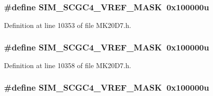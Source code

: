 \subsubsection[{\texorpdfstring{S\+I\+M\+\_\+\+S\+C\+G\+C4\+\_\+\+V\+R\+E\+F\+\_\+\+M\+A\+SK}{SIM_SCGC4_VREF_MASK}}]{\setlength{\rightskip}{0pt plus 5cm}\#define S\+I\+M\+\_\+\+S\+C\+G\+C4\+\_\+\+V\+R\+E\+F\+\_\+\+M\+A\+SK~0x100000u}\hypertarget{group___s_i_m___register___masks_gab32de0f8a4b83a05b226638154da75c0}{}\label{group___s_i_m___register___masks_gab32de0f8a4b83a05b226638154da75c0}


Definition at line 10353 of file M\+K20\+D7.\+h.

\subsubsection[{\texorpdfstring{S\+I\+M\+\_\+\+S\+C\+G\+C4\+\_\+\+V\+R\+E\+F\+\_\+\+M\+A\+SK}{SIM_SCGC4_VREF_MASK}}]{\setlength{\rightskip}{0pt plus 5cm}\#define S\+I\+M\+\_\+\+S\+C\+G\+C4\+\_\+\+V\+R\+E\+F\+\_\+\+M\+A\+SK~0x100000u}\hypertarget{group___s_i_m___register___masks_gab32de0f8a4b83a05b226638154da75c0}{}\label{group___s_i_m___register___masks_gab32de0f8a4b83a05b226638154da75c0}


Definition at line 10358 of file M\+K20\+D7.\+h.

\subsubsection[{\texorpdfstring{S\+I\+M\+\_\+\+S\+C\+G\+C4\+\_\+\+V\+R\+E\+F\+\_\+\+M\+A\+SK}{SIM_SCGC4_VREF_MASK}}]{\setlength{\rightskip}{0pt plus 5cm}\#define S\+I\+M\+\_\+\+S\+C\+G\+C4\+\_\+\+V\+R\+E\+F\+\_\+\+M\+A\+SK~0x100000u}\hypertarget{group___s_i_m___register___masks_gab32de0f8a4b83a05b226638154da75c0}{}\label{group___s_i_m___register___masks_gab32de0f8a4b83a05b226638154da75c0}


